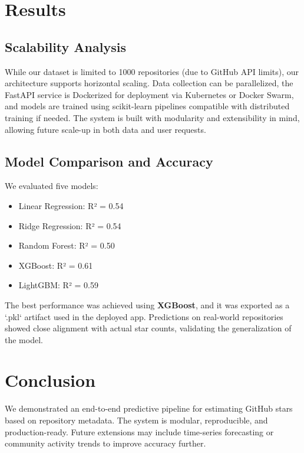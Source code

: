 \documentclass[12pt,a4paper]{article}
\begin{document}
\section{Results}
\subsection{Scalability Analysis}
While our dataset is limited to 1000 repositories (due to GitHub API limits), our architecture supports horizontal scaling. Data collection can be parallelized, the FastAPI service is Dockerized for deployment via Kubernetes or Docker Swarm, and models are trained using scikit-learn pipelines compatible with distributed training if needed. The system is built with modularity and extensibility in mind, allowing future scale-up in both data and user requests.

\subsection{Model Comparison and Accuracy}
We evaluated five models:
\begin{itemize}[noitemsep]
    \item Linear Regression: R² = 0.54
    \item Ridge Regression: R² = 0.54
    \item Random Forest: R² = 0.50
    \item XGBoost: R² = 0.61
    \item LightGBM: R² = 0.59
\end{itemize}

The best performance was achieved using \textbf{XGBoost}, and it was exported as a `.pkl` artifact used in the deployed app. Predictions on real-world repositories showed close alignment with actual star counts, validating the generalization of the model.

\section{Conclusion}
We demonstrated an end-to-end predictive pipeline for estimating GitHub stars based on repository metadata. The system is modular, reproducible, and production-ready. Future extensions may include time-series forecasting or community activity trends to improve accuracy further.
\end{document}
